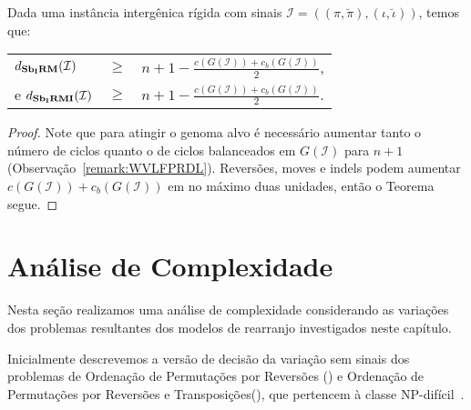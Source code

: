 \begin{theorem}\label{theorem:OCNPWYNL}
Dada uma instância intergênica rígida com sinais $\mathcal{I}=((\pi,\breve\pi),(\iota,\breve\iota))$, temos que:

\begin{tabular}{lll}
  $d_{\textbf{Sb\textsubscript{I}RM}}(\mathcal{I})$     & $ \ge $ & ${n + 1} - \frac{c(G(\mathcal{I})) + c_b(G(\mathcal{I}))}{2}$, \\
  e $d_{\textbf{Sb\textsubscript{I}RMI}}(\mathcal{I})$    & $ \ge $ & ${n + 1} - \frac{c(G(\mathcal{I})) + c_b(G(\mathcal{I}))}{2}$. \\
\end{tabular}
\end{theorem}
\begin{proof}
Note que para atingir o genoma alvo é necessário aumentar tanto o número de ciclos quanto o de ciclos balanceados em $G(\mathcal{I})$ para $n+1$ (Observação~\ref{remark:WVLFPRDL}). Reversões, moves e indels podem aumentar $c(G(\mathcal{I})) + c_b(G(\mathcal{I}))$ em no máximo duas unidades, então o Teorema segue.
\end{proof}


\section{Análise de Complexidade}

Nesta seção realizamos uma análise de complexidade considerando as variações dos problemas resultantes dos modelos de rearranjo investigados neste capítulo.

Inicialmente descrevemos a versão de decisão da variação sem sinais dos problemas de Ordenação de Permutações por Reversões (\SbR) e Ordenação de Permutações por Reversões e Transposições(\SbRT), que pertencem à classe NP-difícil~\cite{1999-caprara,2019b-oliveira-etal}.

\begin{decision}
\end{decision}

\begin{decision}
\end{decision}

